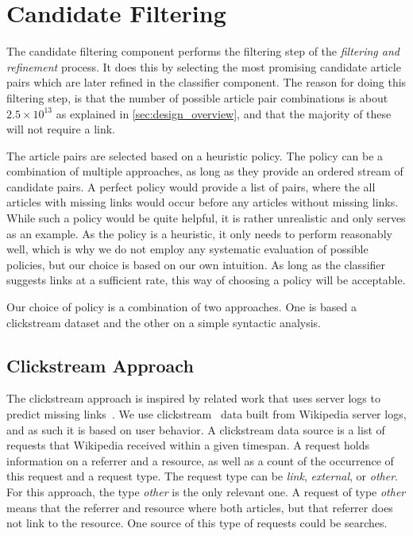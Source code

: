 \section{Candidate Filtering}
The candidate filtering component performs the filtering step of the \emph{filtering and refinement} process. It does this by selecting the most promising candidate article pairs which are later refined in the classifier component. The reason for doing this filtering step, is that the number of possible article pair combinations is about $2.5 \times 10^{13}$ as explained in \cref{sec:design_overview}, and that the majority of these will not require a link.

The article pairs are selected based on a heuristic policy. The policy can be a combination of multiple approaches, as long as they provide an ordered stream of candidate pairs. A perfect policy would provide a list of pairs, where the all articles with missing links would occur before any articles without missing links. While such a policy would be quite helpful, it is rather unrealistic and only serves as an example. As the policy is a heuristic, it only needs to perform reasonably well, which is why we do not employ any systematic evaluation of possible policies, but our choice is based on our own intuition. As long as the classifier suggests links at a sufficient rate, this way of choosing a policy will be acceptable.

Our choice of policy is a combination of two approaches. One is based a clickstream dataset and the other on a simple syntactic analysis.

\subsection{Clickstream Approach}

The clickstream approach is inspired by related work that uses server logs to predict missing links~\cite{hyperlink-structure-using-logs}. We use clickstream~\cite{wiki-clickstream} data built from Wikipedia server logs, and as such it is based on user behavior. A clickstream data source is a list of requests that Wikipedia received within a given timespan. A request holds information on a referrer and a resource, as well as a count of the occurrence of this request and a request type. The request type can be \emph{link}, \emph{external}, or \emph{other}. For this approach, the type \emph{other} is the only relevant one. A request of type \emph{other} means that the referrer and resource where both articles, but that referrer does not link to the resource. One source of this type of requests could be searches.

